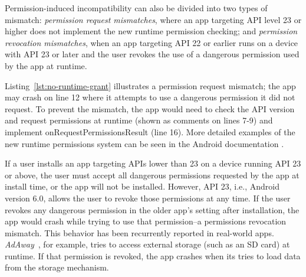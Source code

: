 \begin{figure}[b]%
    \vspace{-0.5cm}
     
\end{figure}

Permission-induced incompatibility can also be divided into
two types of mismatch: {\it permission request mismatches},
where an app targeting API level 23 or higher does not
implement the new runtime permission checking; and {\it
permission revocation mismatches}, when an app targeting API
22 or earlier runs on a device with API 23 or later and the 
user revokes the use of a dangerous permission used by 
the app at runtime.
 

Listing~\ref{lst:no-runtime-grant} illustrates a permission
request mismatch; the app may crash on line 12 where it
attempts to use a dangerous permission it did not request.
To prevent the mismatch, the app would need to check the API
version and request permissions at runtime (shown as
comments on lines 7-9) and implement {\sf
onRequestPermissionsResult} (line 16). More detailed
examples of the new runtime permissions system can be seen
in the Android documentation \cite{runtimepermissions}.


If a user installs an app targeting APIs lower than 23 on a
device running API 23 or above, the user must accept all
dangerous permissions requested by the app at install time,
or the app will not be installed. However, API 23, 
i.e., Android version 6.0, allows the user to revoke those permissions
at any time. If the user revokes any dangerous permission in
the older app's setting after installation, the app would
crash while trying to use that permission--a permissions
revocation mismatch. This behavior has been recurrently
reported in real-world apps. \textit{AdAway}~\cite{adaway},
for example, tries to access external storage (such as an SD
card) at runtime. If that permission is revoked, the app
crashes when its tries to load data from the storage
mechanism.

